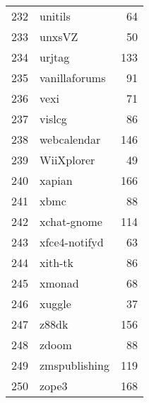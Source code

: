 \begin{table}[ht]
\begin{tabular}{rlr}
  232 & unitils &  64 \\ 
  233 & unxsVZ &  50 \\ 
  234 & urjtag & 133 \\ 
  235 & vanillaforums &  91 \\ 
  236 & vexi &  71 \\ 
  237 & vislcg &  86 \\ 
  238 & webcalendar & 146 \\ 
  239 & WiiXplorer &  49 \\ 
  240 & xapian & 166 \\ 
  241 & xbmc &  88 \\ 
  242 & xchat-gnome & 114 \\ 
  243 & xfce4-notifyd &  63 \\ 
  244 & xith-tk &  86 \\ 
  245 & xmonad &  68 \\ 
  246 & xuggle &  37 \\ 
  247 & z88dk & 156 \\ 
  248 & zdoom &  88 \\ 
  249 & zmspublishing & 119 \\ 
  250 & zope3 & 168 \\ 
   \hline
\end{tabular}
\end{table}